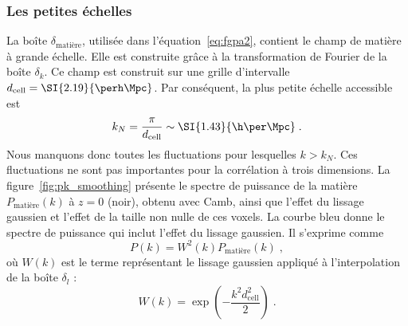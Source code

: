 \subsubsection{Les petites échelles}
La boîte $\delta_{\mathrm{matière}}$, utilisée dans l'équation~\ref{eq:fgpa2}, contient le champ de matière à grande échelle. Elle est construite grâce à la transformation de Fourier de la boîte $\delta_k$.
Ce champ est construit sur une grille d'intervalle $d_{\mathrm{cell}} = \SI{2.19}{\perh\Mpc}$. Par conséquent, la plus petite échelle accessible est
\begin{equation}
  k_N = \frac{\pi}{d_{\mathrm{cell}}} \sim \SI{1.43}{\h\per\Mpc} \; .
\end{equation}
Nous manquons donc toutes les fluctuations pour lesquelles $k > k_N$.
Ces fluctuations ne sont pas importantes pour la corrélation à trois dimensions. La figure~\ref{fig:pk_smoothing} présente le spectre de puissance de la matière $P_{\mathrm{matière}}(k)$ à $z=0$ (noir), obtenu avec Camb, ainsi que l'effet du lissage gaussien et l'effet de la taille non nulle de ces voxels.
  La courbe bleu donne le spectre de puissance qui inclut l'effet du lissage gaussien. Il s'exprime comme
  \begin{equation}
    P(k) =  W^2(k) P_{\mathrm{matière}}(k) \; ,
  \end{equation}
  où $W(k)$ est le terme représentant le lissage gaussien appliqué à l'interpolation de la boîte $\delta_l$ :
  \begin{equation}
    \label{eq:gauss_smoothing}
    W(k) = \exp(- \frac{k^2 d_{\mathrm{cell}}^2}{2}) \; .
  \end{equation}
